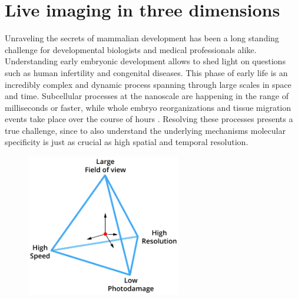 

\chapter{Live imaging in three dimensions}

\graphicspath{{./figures/1_spim/}}

Unraveling the secrets of mammalian development has been a long standing challenge for developmental biologists and medical professionals alike. Understanding early embryonic development allows to shed light on questions such as human infertility and congenital diseases. 
This phase of early life is an incredibly complex and dynamic process spanning through large scales in space and time. Subcellular processes at the nanoscale are happening in the range of milliseconds or faster, while whole embryo reorganizations and tissue migration events take place over the course of hours \cite{gilbert_developmental_2013}. Resolving these processes presents a true challenge, since to also understand the underlying mechanisms molecular specificity is just as crucial as high spatial and temporal resolution.

\begin{figure}
  \centering
  \includegraphics[width=0.6\textwidth]{tradeoffs}
  \label{fig:tradeoffs}
\end{figure}

